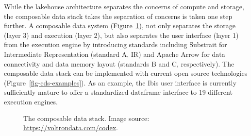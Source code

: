 \documentclass[
  authoryear]{elsarticle}
\begin{document}
While the lakehouse architecture separates the concerns of compute and
storage, the composable data stack takes the separation of concerns is
taken one step further. A composable data system
(Figure~\ref{fig-composable-data-stack}), not only separates the storage
(layer 3) and execution (layer 2), but also separates the user interface
(layer 1) from the execution engine by introducing standards including
Substrait for Intermediate Representation (standard A, IR) and Apache
Arrow for data connectivity and data memory layout (standards B and C,
respectively). The composable data stack can be implemented with current
open source technologies (Figure~\ref{fig-cds-examples}). As an example,
the Ibis user interface is currently sufficiently mature to offer a
standardized dataframe interface to 19 different execution engines.

\begin{figure}


\caption{\label{fig-composable-data-stack}The composable data stack.
Image source: \url{https://voltrondata.com/codex}.}

\end{figure}%
\end{document}
